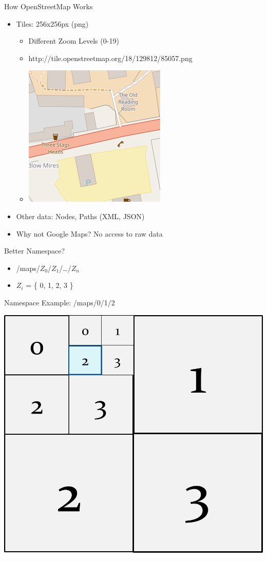 \begin{frame}{How OpenStreetMap Works}

\begin{itemize}
\item Tiles: 256x256px (png)
\begin{itemize}
\item Different Zoom Levels (0-19)
\item http://tile.openstreetmap.org/18/129812/85057.png
\item 
\includegraphics[width=0.25\linewidth]{images/tile.png}
\pause


\end{itemize}
\item Other data: Nodes, Paths (XML, JSON)
\item Why not Google Maps? No access to raw data
\end{itemize}
\pause

Better Namespace?
\begin{itemize}
\item /maps/$Z_0$/$Z_1$/\ldots/$Z_n$
\item $Z_i$ = \{ 0, 1, 2, 3 \}
\end{itemize}
\end{frame}


\begin{frame}{Namespace Example: /maps/0/1/2}
\begin{center}
\includegraphics[width=0.75\linewidth]{images/square.png}
\end{center}

\end{frame}



